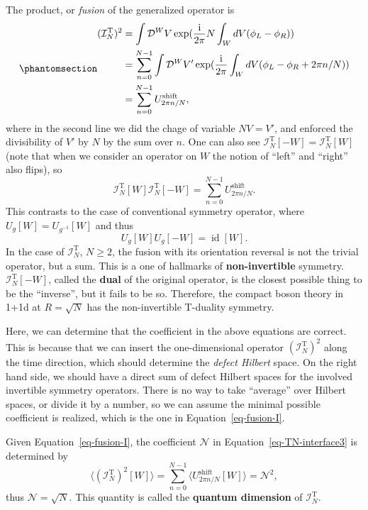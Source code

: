 \documentclass[
  letterpaper,
  DIV=11,
  numbers=noendperiod]{scrreport}
\DeclareMathOperator{\imunit}{i}
\DeclareMathOperator{\id}{id}
\begin{document}
The product, or \emph{fusion} of the generalized operator is
\begin{equation}\phantomsection\label{eq-fusion-I}{
\begin{aligned}
(\mathcal{I}_N^\text{T})^2 &= \int \mathcal{D}^W V \exp(\frac{\imunit}{2\pi} N \int_W \mathop{dV}(\phi_L-\phi_R))\\
&= \sum_{n=0}^{N-1} \int \mathcal{D}^W V' \exp(\frac{\imunit}{2\pi}  \int_W \mathop{dV}(\phi_L-\phi_R+ 2\pi n/N))\\
&= \sum_{n=0}^{N-1} U_{2\pi n/N}^{\text{shift}},
\end{aligned}
}\end{equation} where in the second line we did the chage of variable
\(NV = V'\), and enforced the divisibility of \(V'\) by \(N\) by the sum
over \(n\). One can also see
\(\mathcal{I}_N^\text{T}[-W] = \mathcal{I}_N^\text{T}[W]\) (note that
when we consider an operator on \(W\) the notion of ``left'' and
``right'' also flips), so \[
\mathcal{I}_N^\text{T}[W]\mathcal{I}_N^\text{T}[-W] = \sum_{n=0}^{N-1} U_{2\pi n/N}^{\text{shift}}.
\] This contrasts to the case of conventional symmetry operator, where
\(U_g[W] = U_{g^{-1}}[W]\) and thus \[
U_g [W] U_g[-W] = \id[W].
\] In the case of \(\mathcal{I}_N^\text{T}\), \(N\ge 2\), the fusion
with its orientation reversal is not the trivial operator, but a sum.
This is a one of hallmarks of \textbf{non-invertible} symmetry.
\(\mathcal{I}_N^\text{T}[-W]\), called the \textbf{dual} of the original
operator, is the closest possible thing to be the ``inverse'', but it
fails to be so. Therefore, the compact boson theory in 1+1d at
\(R=\sqrt{N}\) has the non-invertible T-duality symmetry.

Here, we can determine that the coefficient in the above equations are
correct. This is because that we can insert the one-dimensional operator
\((\mathcal{I}_N^\text{T})^2\) along the time direction, which should
determine the \emph{defect Hilbert} space. On the right hand side, we
should have a direct sum of defect Hilbert spaces for the involved
invertible symmetry operators. There is no way to take ``average'' over
Hilbert spaces, or divide it by a number, so we can assume the minimal
possible coefficient is realized, which is the one in
Equation~\ref{eq-fusion-I}.

Given Equation~\ref{eq-fusion-I}, the coefficient \(\mathcal{N}\) in
Equation~\ref{eq-TN-interface3} is determined by \[
\langle (\mathcal{I}_N^\text{T})^2[W] \rangle = \sum_{n=0}^{N-1}\langle U_{2\pi n/N}^\text{shift}[W] \rangle = \mathcal{N}^2,
\] thus \(\mathcal{N} = \sqrt{N}\). This quantity is called the
\textbf{quantum dimension} of \(\mathcal{I}_N^\text{T}\).
\end{document}
